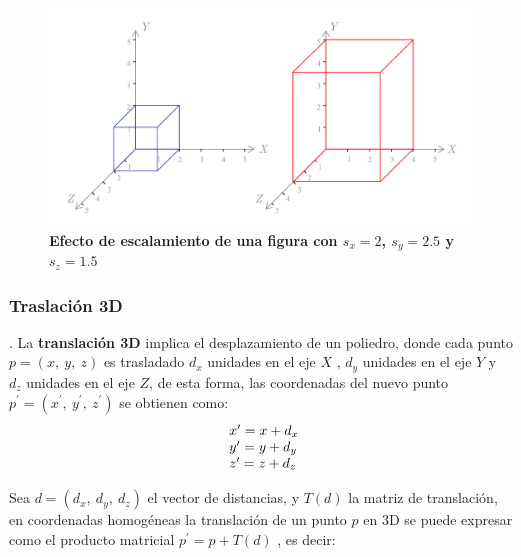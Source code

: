 \begin{center}
\begin{figure}[h]
\includegraphics[width=12cm]{Img/GEO/geo-escala0.jpg}
\centering
\caption{\textbf{\footnotesize{Efecto de escalamiento de una figura con $s_x=2$, $s_y=2.5$ y $s_z=1.5$}}}
\end{figure}
\end{center}

\subsubsection{Traslación 3D}
 \citep{Matias2007}. La \textbf{translación 3D} implica el desplazamiento de un poliedro, donde cada punto $p = (x,\ y,\ z)$ es trasladado $d_x$ unidades en el eje $X$ , $d_y$ unidades en el eje $Y$ y $d_z$ unidades en el eje $Z$, de esta forma, las coordenadas del nuevo punto
$p^{\prime} = ({x}^{\prime}, \ {y}^{\prime}, \ {z}^{\prime})$ se obtienen como:
$$
\begin{array}{l@{}l}
{x}^{\prime} = x + d_{x}
\\
{y}^{\prime} = y + d_{y}
\\
{z}^{\prime} = z + d_{z}
\end{array}
$$

Sea $d = (d_{x},\ d_{y},\ d_{z})$ el vector de distancias, y $T(d)$ la matriz de translación, en
coordenadas homogéneas la translación de un punto $p$ en 3D se puede expresar como el producto matricial $p^{\prime} = p + T(d)$ , es decir:

